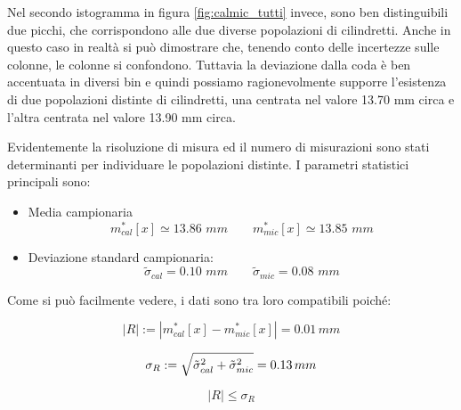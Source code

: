 Nel secondo istogramma in figura \ref{fig:calmic_tutti} invece, sono ben distinguibili due picchi,
che corrispondono alle due diverse popolazioni di cilindretti. Anche in questo caso in realtà si può
dimostrare che, tenendo conto delle incertezze sulle colonne, le colonne si confondono. Tuttavia
la deviazione dalla coda è ben accentuata in diversi bin e quindi possiamo ragionevolmente 
supporre l'esistenza di due popolazioni distinte di cilindretti, una centrata nel valore
13.70 mm circa e l'altra centrata nel valore 13.90 mm circa.

Evidentemente la risoluzione di misura ed il numero di misurazioni sono stati
determinanti per individuare le popolazioni distinte.
I parametri statistici principali sono:

\begin{itemize}
    \item{Media campionaria}
    \begin{equation*}
        m^*_{cal}[x] \simeq 13.86\,\,mm \qquad
        m^*_{mic}[x] \simeq 13.85\,\,mm 
    \end{equation*}

    \item{Deviazione standard campionaria:}
    \begin{equation*}
        \tilde{\sigma}_{cal} = 0.10\,\,mm \qquad
        \tilde{\sigma}_{mic} = 0.08\,\,mm
    \end{equation*}
\end{itemize}

Come si può facilmente vedere, i dati sono tra loro compatibili poiché:

\begin{equation*}
    |R| := |m^*_{cal}[x] - m^*_{mic}[x]| = 0.01 \, mm
\end{equation*}

\begin{equation*}
    \sigma_{R} := \sqrt{\tilde{\sigma}_{cal}^2 + \tilde{\sigma}_{mic}^2} = 0.13 \, mm \\
\end{equation*}


\begin{equation*}
    |R| \leq \sigma_{R}
\end{equation*}
